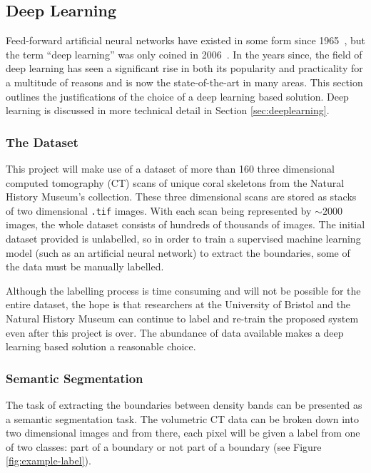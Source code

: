 \subsection{Deep Learning}
\label{sec:contextdl}

Feed-forward artificial neural networks have existed in some form since 1965~\cite{deepoverview, 1966cybernetic}, but the term ``deep learning'' was only coined in 2006~\cite{deepoverview, hintondeep, hintonfast}. In the years since, the field of deep learning has seen a significant rise in both its popularity and practicality for a multitude of reasons and is now the state-of-the-art in many areas. This section outlines the justifications of the choice of a deep learning based solution. Deep learning is discussed in more technical detail in Section \ref{sec:deeplearning}.

\subsubsection{The Dataset}

This project will make use of a dataset of more than 160 three dimensional computed tomography (CT) scans of unique coral skeletons from the Natural History Museum's collection. These three dimensional scans are stored as stacks of two dimensional \texttt{.tif} images. With each scan being represented by ${\sim}2000$ images, the whole dataset consists of hundreds of thousands of images. The initial dataset provided is unlabelled, so in order to train a supervised machine learning model (such as an artificial neural network) to extract the boundaries, some of the data must be manually labelled.

Although the labelling process is time consuming and will not be possible for the entire dataset, the hope is that researchers at the University of Bristol and the Natural History Museum can continue to label and re-train the proposed system even after this project is over. The abundance of data available makes a deep learning based solution a reasonable choice.

\subsubsection{Semantic Segmentation}
\label{sec:semseg}

The task of extracting the boundaries between density bands can be presented as a semantic segmentation task. The volumetric CT data can be broken down into two dimensional images and from there, each pixel will be given a label from one of two classes: part of a boundary or not part of a boundary (see Figure \ref{fig:example-label}).


